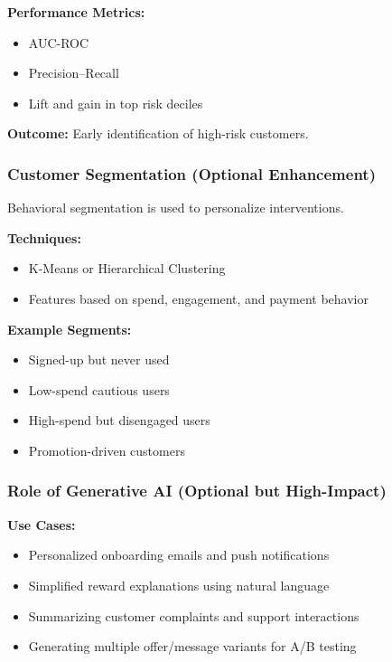 \documentclass[10pt,a4paper]{article}
\begin{document}
	\textbf{Performance Metrics:}
	\begin{itemize}
	    \item AUC-ROC
	    \item Precision--Recall
	    \item Lift and gain in top risk deciles
	\end{itemize}
	
	\textbf{Outcome:} Early identification of high-risk customers.
	
	\subsubsection{Customer Segmentation (Optional Enhancement)}
	
	Behavioral segmentation is used to personalize interventions.
	
	\textbf{Techniques:}
	\begin{itemize}
	    \item K-Means or Hierarchical Clustering
	    \item Features based on spend, engagement, and payment behavior
	\end{itemize}
	
	\textbf{Example Segments:}
	\begin{itemize}
	    \item Signed-up but never used
	    \item Low-spend cautious users
	    \item High-spend but disengaged users
	    \item Promotion-driven customers
	\end{itemize}
	
	\subsubsection{Role of Generative AI (Optional but High-Impact)}
	
	\textbf{Use Cases:}
	\begin{itemize}
	    \item Personalized onboarding emails and push notifications
	    \item Simplified reward explanations using natural language
	    \item Summarizing customer complaints and support interactions
	    \item Generating multiple offer/message variants for A/B testing
	\end{itemize}
	
\end{document}
